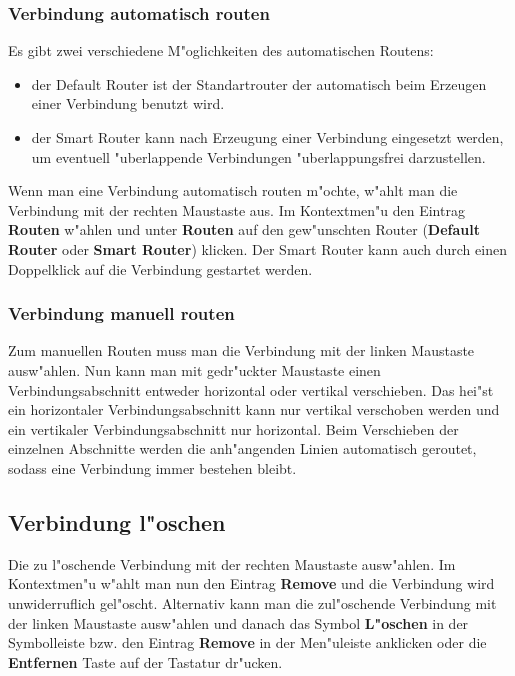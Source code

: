 \documentclass[a4paper,titlepage,12pt,ngerman]{scrbook}
\begin{document}
\subsubsection{Verbindung automatisch routen}
Es gibt zwei verschiedene M"oglichkeiten des automatischen Routens:
\begin{itemize}
\item der Default Router ist der Standartrouter der automatisch beim Erzeugen einer Verbindung benutzt wird.
\item der Smart Router kann nach Erzeugung einer Verbindung eingesetzt werden, um eventuell "uberlappende Verbindungen "uberlappungsfrei darzustellen.
\end{itemize}
Wenn man eine Verbindung automatisch routen m"ochte, w"ahlt man die Verbindung mit der rechten Maustaste aus. Im Kontextmen"u den Eintrag {\bf Routen} w"ahlen und unter {\bf Routen} auf den gew"unschten Router ({\bf Default Router} oder {\bf Smart Router}) klicken.\newline
Der Smart Router kann auch durch einen Doppelklick auf die Verbindung gestartet werden.

\subsubsection{Verbindung manuell routen}
Zum manuellen Routen muss man die Verbindung mit der linken Maustaste ausw"ahlen. Nun kann man mit gedr"uckter Maustaste einen Verbindungsabschnitt entweder horizontal oder vertikal verschieben. Das hei"st ein horizontaler Verbindungsabschnitt kann nur vertikal verschoben werden und ein vertikaler Verbindungsabschnitt nur horizontal. Beim Verschieben der einzelnen Abschnitte werden die anh"angenden Linien automatisch geroutet, sodass eine Verbindung immer bestehen bleibt.

\subsection{Verbindung l"oschen}
Die zu l"oschende Verbindung mit der rechten Maustaste ausw"ahlen. Im Kontextmen"u w"ahlt man nun den Eintrag {\bf Remove} und die Verbindung wird unwiderruflich gel"oscht.
Alternativ kann man die zul"oschende Verbindung mit der linken Maustaste ausw"ahlen und danach das Symbol {\bf L"oschen} in der Symbolleiste bzw. den Eintrag {\bf Remove} in der Men"uleiste anklicken oder die {\bf Entfernen} Taste auf der Tastatur dr"ucken.
\end{document}
